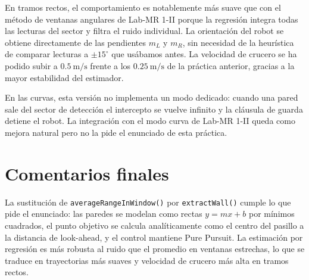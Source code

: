 En tramos rectos, el comportamiento es notablemente m\'{a}s suave que con el m\'{e}todo de ventanas angulares de Lab-MR 1-II porque la regresi\'{o}n integra todas las lecturas del sector y filtra el ruido individual. La orientaci\'{o}n del robot se obtiene directamente de las pendientes $m_L$ y $m_R$, sin necesidad de la heur\'{i}stica de comparar lecturas a $\pm 15^\circ$ que us\'{a}bamos antes. La velocidad de crucero se ha podido subir a $\SI{0.5}{\meter\per\second}$ frente a los $\SI{0.25}{\meter\per\second}$ de la pr\'{a}ctica anterior, gracias a la mayor estabilidad del estimador.

En las curvas, esta versi\'{o}n no implementa un modo dedicado: cuando una pared sale del sector de detecci\'{o}n el intercepto se vuelve infinito y la cl\'{a}usula de guarda detiene el robot. La integraci\'{o}n con el modo curva de Lab-MR 1-II queda como mejora natural pero no la pide el enunciado de esta pr\'{a}ctica.


\section{Comentarios finales}

La sustituci\'{o}n de \texttt{averageRangeInWindow()} por \texttt{extractWall()} cumple lo que pide el enunciado: las paredes se modelan como rectas $y = mx + b$ por m\'{i}nimos cuadrados, el punto objetivo se calcula anal\'{i}ticamente como el centro del pasillo a la distancia de look-ahead, y el control mantiene Pure Pursuit. La estimaci\'{o}n por regresi\'{o}n es m\'{a}s robusta al ruido que el promedio en ventanas estrechas, lo que se traduce en trayectorias m\'{a}s suaves y velocidad de crucero m\'{a}s alta en tramos rectos.
